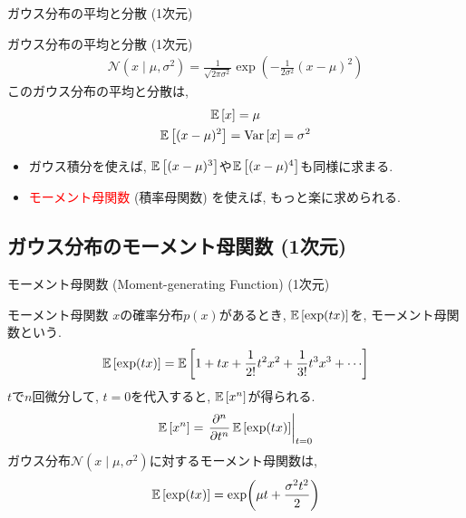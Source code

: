 \documentclass[dvipdfmx,notheorems,t]{beamer}
\begin{document}
\begin{frame}{ガウス分布の平均と分散 (1次元)}
\begin{block}{ガウス分布の平均と分散 (1次元)}
  \begin{align*}
    \mathcal{N}(x \mid \mu, \sigma^2) = \frac{1}{\sqrt{2 \pi \sigma^2}}
      \exp \left( -\frac{1}{2 \sigma^2} \left( x - \mu \right)^2 \right)
  \end{align*}
  このガウス分布の平均と分散は,
  \begin{gather*}
    \operatorname{\mathbb{E}} \left[ x \right] = \mu \\
    \operatorname{\mathbb{E}} \left[ (x - \mu)^2 \right] = \operatorname{Var} \left[ x \right] = \sigma^2
  \end{gather*}
\end{block}

\begin{itemize}
  \item ガウス積分を使えば, $\operatorname{\mathbb{E}} \left[ (x - \mu)^3 \right]$や$\operatorname{\mathbb{E}} \left[ (x - \mu)^4 \right]$も同様に求まる.
  \item \textcolor{red}{モーメント母関数} (積率母関数) を使えば, もっと楽に求められる.
\end{itemize}
\end{frame}

\subsection{ガウス分布のモーメント母関数 (1次元)}

\begin{frame}{モーメント母関数 (Moment-generating Function) (1次元)}
\begin{block}{モーメント母関数}
  $x$の確率分布$p(x)$があるとき, $\operatorname{\mathbb{E}} \left[ \exp(tx) \right]$を, モーメント母関数という.
  \begin{align*}
    \E{\exp(tx)} = \E{1 + tx + \frac{1}{2!} t^2 x^2 + \frac{1}{3!} t^3 x^3 + \cdots}
  \end{align*}
  $t$で$n$回微分して, $t = 0$を代入すると, $\operatorname{\mathbb{E}} \left[ x^n \right]$が得られる.
  \begin{align*}
    \operatorname{\mathbb{E}} \left[ x^n \right] = \left. \pdv[n]{t} \operatorname{\mathbb{E}} \left[ \exp(tx) \right] \right|_{t = 0}
  \end{align*}
  ガウス分布$\mathcal{N}(x \mid \mu, \sigma^2)$に対するモーメント母関数は,
  \begin{align*}
    \operatorname{\mathbb{E}} \left[ \exp(tx) \right] = \exp(\mu t + \frac{\sigma^2 t^2}{2})
  \end{align*}
\end{block}
\end{frame}
\end{document}
